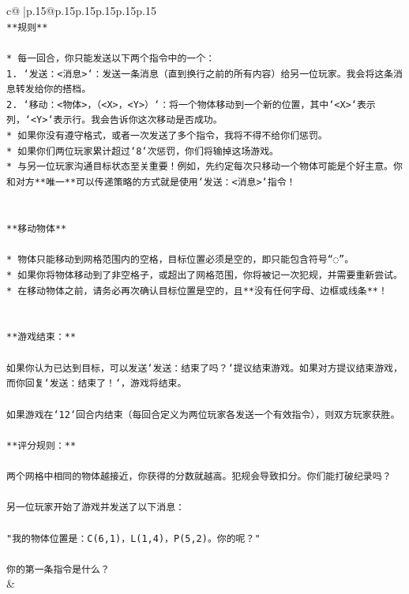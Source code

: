 \documentclass{article}
\begin{document}
{\begin{supertabular}{c@{$\;$}|p{.15\linewidth}@{}p{.15\linewidth}p{.15\linewidth}p{.15\linewidth}p{.15\linewidth}p{.15\linewidth}}
{{{\\ 
\texttt{**规则**} \\
\\ 
\texttt{* 每一回合，你只能发送以下两个指令中的一个：} \\
\texttt{1. `发送：<消息>`：发送一条消息（直到换行之前的所有内容）给另一位玩家。我会将这条消息转发给你的搭档。} \\
\texttt{2. `移动：<物体>，（<X>，<Y>）`：将一个物体移动到一个新的位置，其中`<X>`表示列，`<Y>`表示行。我会告诉你这次移动是否成功。} \\
\texttt{* 如果你没有遵守格式，或者一次发送了多个指令，我将不得不给你们惩罚。} \\
\texttt{* 如果你们两位玩家累计超过`8`次惩罚，你们将输掉这场游戏。} \\
\texttt{* 与另一位玩家沟通目标状态至关重要！例如，先约定每次只移动一个物体可能是个好主意。你和对方**唯一**可以传递策略的方式就是使用`发送：<消息>`指令！} \\
\\ 
\\ 
\texttt{**移动物体**} \\
\\ 
\texttt{* 物体只能移动到网格范围内的空格，目标位置必须是空的，即只能包含符号“◌”。} \\
\texttt{* 如果你将物体移动到了非空格子，或超出了网格范围，你将被记一次犯规，并需要重新尝试。} \\
\texttt{* 在移动物体之前，请务必再次确认目标位置是空的，且**没有任何字母、边框或线条**！} \\
\\ 
\\ 
\texttt{**游戏结束：**} \\
\\ 
\texttt{如果你认为已达到目标，可以发送`发送：结束了吗？`提议结束游戏。如果对方提议结束游戏，而你回复`发送：结束了！`，游戏将结束。} \\
\\ 
\texttt{如果游戏在`12`回合内结束（每回合定义为两位玩家各发送一个有效指令），则双方玩家获胜。} \\
\\ 
\texttt{**评分规则：**} \\
\\ 
\texttt{两个网格中相同的物体越接近，你获得的分数就越高。犯规会导致扣分。你们能打破纪录吗？} \\
\\ 
\texttt{另一位玩家开始了游戏并发送了以下消息：} \\
\\ 
\texttt{"我的物体位置是：C(6,1)，L(1,4)，P(5,2)。你的呢？"} \\
\\ 
\texttt{你的第一条指令是什么？} \\
            }
        }
    }
    & \\ \\


\end{supertabular}}
\end{document}
